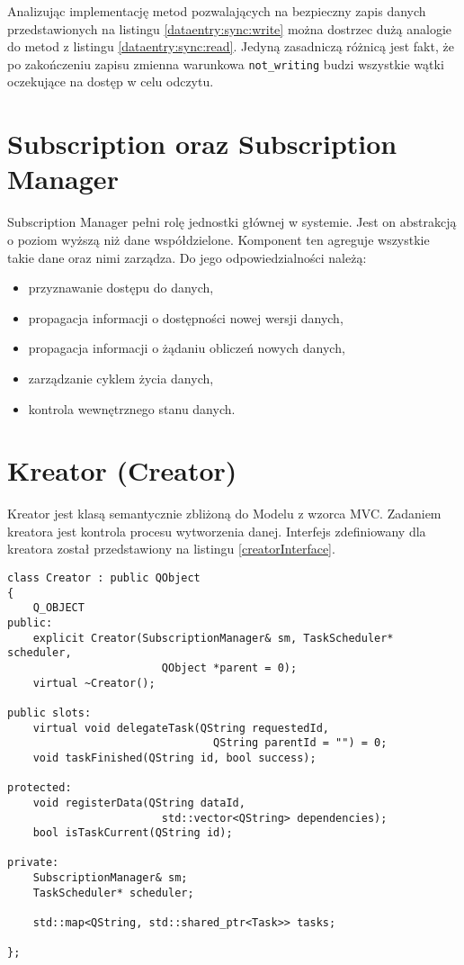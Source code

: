 Analizując implementację metod pozwalających na bezpieczny zapis danych przedstawionych na listingu \ref{dataentry:sync:write} można dostrzec dużą analogie do metod z listingu \ref{dataentry:sync:read}. Jedyną zasadniczą różnicą jest fakt, że po zakończeniu zapisu zmienna warunkowa \lstinline$not_writing$ budzi wszystkie wątki oczekujące na dostęp w celu odczytu.

\section{Subscription oraz Subscription Manager}

Subscription Manager pełni rolę jednostki głównej w systemie. Jest on abstrakcją o poziom wyższą niż dane współdzielone. Komponent ten agreguje wszystkie takie dane oraz nimi zarządza. Do jego odpowiedzialności należą:
\begin{itemize}
	\item przyznawanie dostępu do danych,
	\item propagacja informacji o dostępności nowej wersji danych,
	\item propagacja informacji o żądaniu obliczeń nowych danych,
	\item zarządzanie cyklem życia danych,
	\item kontrola wewnętrznego stanu danych.
\end{itemize}




\section{Kreator (Creator)}

Kreator jest klasą semantycznie zbliżoną do Modelu z wzorca MVC. Zadaniem kreatora jest kontrola procesu wytworzenia danej. Interfejs zdefiniowany dla kreatora został przedstawiony na listingu \ref{creatorInterface}.

\begin{minipage}{\textwidth}
	\begin{lstlisting}[label=creatorInterface, caption={Interfejs klasy \lstinline$Creator$},alsoletter={()[].=}]
class Creator : public QObject
{
	Q_OBJECT
public:
	explicit Creator(SubscriptionManager& sm, TaskScheduler* scheduler,
						QObject *parent = 0);
	virtual ~Creator();

public slots:
	virtual void delegateTask(QString requestedId,
								QString parentId = "") = 0;
	void taskFinished(QString id, bool success);

protected:
	void registerData(QString dataId,
						std::vector<QString> dependencies);
	bool isTaskCurrent(QString id);

private:
	SubscriptionManager& sm;
	TaskScheduler* scheduler;
	
	std::map<QString, std::shared_ptr<Task>> tasks;

};
	\end{lstlisting}
\end{minipage}



